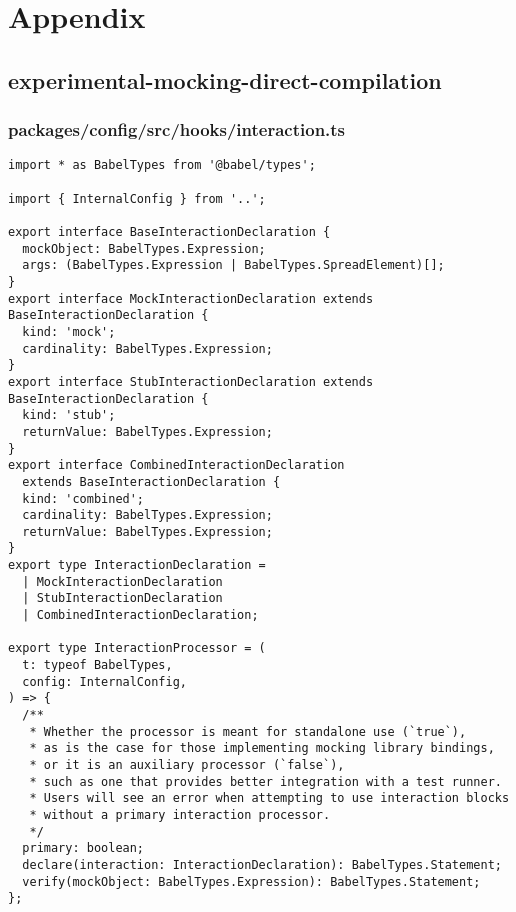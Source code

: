 \chapter*{Appendix}
\pagestyle{plain}


\section*{experimental-mocking-direct-compilation}

\subsection*{packages/config/src/hooks/interaction.ts}
\begin{verbatim}
import * as BabelTypes from '@babel/types';

import { InternalConfig } from '..';

export interface BaseInteractionDeclaration {
  mockObject: BabelTypes.Expression;
  args: (BabelTypes.Expression | BabelTypes.SpreadElement)[];
}
export interface MockInteractionDeclaration extends BaseInteractionDeclaration {
  kind: 'mock';
  cardinality: BabelTypes.Expression;
}
export interface StubInteractionDeclaration extends BaseInteractionDeclaration {
  kind: 'stub';
  returnValue: BabelTypes.Expression;
}
export interface CombinedInteractionDeclaration
  extends BaseInteractionDeclaration {
  kind: 'combined';
  cardinality: BabelTypes.Expression;
  returnValue: BabelTypes.Expression;
}
export type InteractionDeclaration =
  | MockInteractionDeclaration
  | StubInteractionDeclaration
  | CombinedInteractionDeclaration;

export type InteractionProcessor = (
  t: typeof BabelTypes,
  config: InternalConfig,
) => {
  /**
   * Whether the processor is meant for standalone use (`true`),
   * as is the case for those implementing mocking library bindings,
   * or it is an auxiliary processor (`false`),
   * such as one that provides better integration with a test runner.
   * Users will see an error when attempting to use interaction blocks
   * without a primary interaction processor.
   */
  primary: boolean;
  declare(interaction: InteractionDeclaration): BabelTypes.Statement;
  verify(mockObject: BabelTypes.Expression): BabelTypes.Statement;
};
\end{verbatim}

